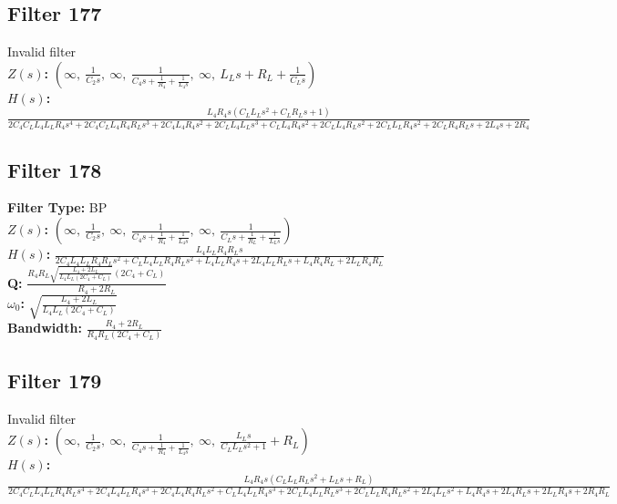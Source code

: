 \documentclass{article}
\begin{document}
\subsection*{Filter 177}
Invalid filter \\ 
\textbf{$Z(s)$:} $\left( \infty, \  \frac{1}{C_{2} s}, \  \infty, \  \frac{1}{C_{4} s + \frac{1}{R_{4}} + \frac{1}{L_{4} s}}, \  \infty, \  L_{L} s + R_{L} + \frac{1}{C_{L} s}\right)$ \\ 
\textbf{$H(s)$:} $\frac{L_{4} R_{4} s \left(C_{L} L_{L} s^{2} + C_{L} R_{L} s + 1\right)}{2 C_{4} C_{L} L_{4} L_{L} R_{4} s^{4} + 2 C_{4} C_{L} L_{4} R_{4} R_{L} s^{3} + 2 C_{4} L_{4} R_{4} s^{2} + 2 C_{L} L_{4} L_{L} s^{3} + C_{L} L_{4} R_{4} s^{2} + 2 C_{L} L_{4} R_{L} s^{2} + 2 C_{L} L_{L} R_{4} s^{2} + 2 C_{L} R_{4} R_{L} s + 2 L_{4} s + 2 R_{4}}$ \\ 
\subsection*{Filter 178}
\textbf{Filter Type:} BP \\ 
\textbf{$Z(s)$:} $\left( \infty, \  \frac{1}{C_{2} s}, \  \infty, \  \frac{1}{C_{4} s + \frac{1}{R_{4}} + \frac{1}{L_{4} s}}, \  \infty, \  \frac{1}{C_{L} s + \frac{1}{R_{L}} + \frac{1}{L_{L} s}}\right)$ \\ 
\textbf{$H(s)$:} $\frac{L_{4} L_{L} R_{4} R_{L} s}{2 C_{4} L_{4} L_{L} R_{4} R_{L} s^{2} + C_{L} L_{4} L_{L} R_{4} R_{L} s^{2} + L_{4} L_{L} R_{4} s + 2 L_{4} L_{L} R_{L} s + L_{4} R_{4} R_{L} + 2 L_{L} R_{4} R_{L}}$ \\ 
\textbf{Q:} $\frac{R_{4} R_{L} \sqrt{\frac{L_{4} + 2 L_{L}}{L_{4} L_{L} \left(2 C_{4} + C_{L}\right)}} \left(2 C_{4} + C_{L}\right)}{R_{4} + 2 R_{L}}$ \\ 
\textbf{$\omega_0$:} $\sqrt{\frac{L_{4} + 2 L_{L}}{L_{4} L_{L} \left(2 C_{4} + C_{L}\right)}}$ \\ 
\textbf{Bandwidth:} $\frac{R_{4} + 2 R_{L}}{R_{4} R_{L} \left(2 C_{4} + C_{L}\right)}$ \\ 
\subsection*{Filter 179}
Invalid filter \\ 
\textbf{$Z(s)$:} $\left( \infty, \  \frac{1}{C_{2} s}, \  \infty, \  \frac{1}{C_{4} s + \frac{1}{R_{4}} + \frac{1}{L_{4} s}}, \  \infty, \  \frac{L_{L} s}{C_{L} L_{L} s^{2} + 1} + R_{L}\right)$ \\ 
\textbf{$H(s)$:} $\frac{L_{4} R_{4} s \left(C_{L} L_{L} R_{L} s^{2} + L_{L} s + R_{L}\right)}{2 C_{4} C_{L} L_{4} L_{L} R_{4} R_{L} s^{4} + 2 C_{4} L_{4} L_{L} R_{4} s^{3} + 2 C_{4} L_{4} R_{4} R_{L} s^{2} + C_{L} L_{4} L_{L} R_{4} s^{3} + 2 C_{L} L_{4} L_{L} R_{L} s^{3} + 2 C_{L} L_{L} R_{4} R_{L} s^{2} + 2 L_{4} L_{L} s^{2} + L_{4} R_{4} s + 2 L_{4} R_{L} s + 2 L_{L} R_{4} s + 2 R_{4} R_{L}}$ \\ 
\end{document}
